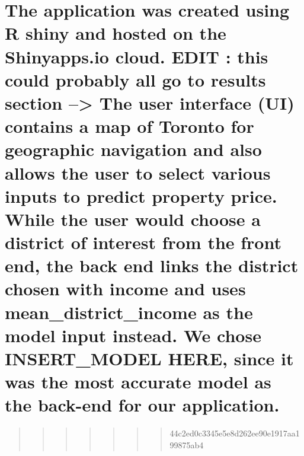 \documentclass[11pt,]{article}
\begin{document}
\hypertarget{the-application-was-created-using-r-shiny-and-hosted-on-the-shinyapps.io-cloud.-edit-this-could-probably-all-go-to-results-section-the-user-interface-ui-contains-a-map-of-toronto-for-geographic-navigation-and-also-allows-the-user-to-select-various-inputs-to-predict-property-price.-while-the-user-would-choose-a-district-of-interest-from-the-front-end-the-back-end-links-the-district-chosen-with-income-and-uses-mean_district_income-as-the-model-input-instead.-we-chose-insert_model-here-since-it-was-the-most-accurate-model-as-the-back-end-for-our-application.}{%
\section{The application was created using R shiny and hosted on the
Shinyapps.io cloud. EDIT : this could probably all go to results section
--\textgreater{} The user interface (UI) contains a map of Toronto for
geographic navigation and also allows the user to select various inputs
to predict property price. While the user would choose a district of
interest from the front end, the back end links the district chosen with
income and uses mean\_district\_income as the model input instead. We
chose INSERT\_MODEL HERE, since it was the most accurate model as the
back-end for our
application.}\label{the-application-was-created-using-r-shiny-and-hosted-on-the-shinyapps.io-cloud.-edit-this-could-probably-all-go-to-results-section-the-user-interface-ui-contains-a-map-of-toronto-for-geographic-navigation-and-also-allows-the-user-to-select-various-inputs-to-predict-property-price.-while-the-user-would-choose-a-district-of-interest-from-the-front-end-the-back-end-links-the-district-chosen-with-income-and-uses-mean_district_income-as-the-model-input-instead.-we-chose-insert_model-here-since-it-was-the-most-accurate-model-as-the-back-end-for-our-application.}}

\begin{quote}
\begin{quote}
\begin{quote}
\begin{quote}
\begin{quote}
\begin{quote}
\begin{quote}
44c2ed0c3345e5e8d262ee90e1917aa199875ab4
\end{quote}
\end{quote}
\end{quote}
\end{quote}
\end{quote}
\end{quote}
\end{quote}
\end{document}
